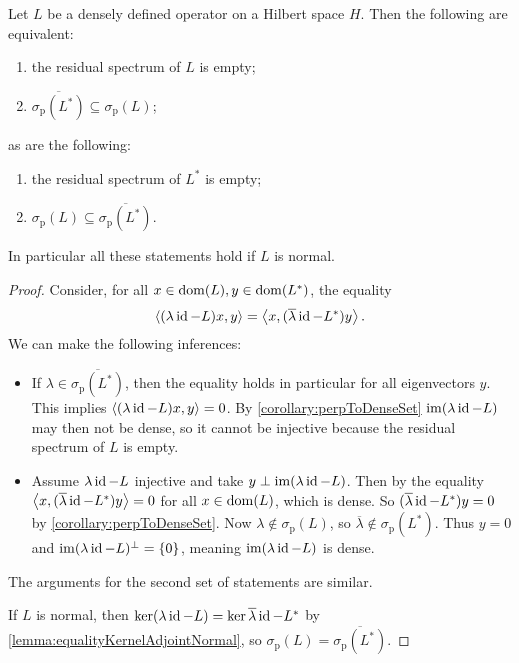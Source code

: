 \begin{proposition} \label{prop:adjointSpectrumNoResidual}
Let $L$ be a densely defined operator on a Hilbert space $H$. Then the following are equivalent:
\begin{enumerate}
\item the residual spectrum of $L$ is empty;
\item $\overline{\sigma_\text{p}(L^*)} \subseteq \sigma_\text{p}(L)$;
\end{enumerate}
as are the following:
\begin{enumerate}
\item the residual spectrum of $L^*$ is empty;
\item $\sigma_\text{p}(L) \subseteq \overline{\sigma_\text{p}(L^*)}$.
\end{enumerate}
In particular all these statements hold if $L$ is normal.
\end{proposition}
\begin{proof}
Consider, for all $x\in \operatorname{dom}(L), y\in\operatorname{dom}(L^*)$, the equality
\[ \left\langle (\lambda\operatorname{id}-L)x,y \right\rangle = \left\langle x,(\overline{\lambda}\operatorname{id}-L^*)y \right\rangle. \]
We can make the following inferences:
\begin{itemize}
\item If $\lambda\in \overline{\sigma_\text{p}(L^*)}$, then the equality holds in particular for all eigenvectors $y$. This implies $\left\langle (\lambda\operatorname{id}-L)x,y \right\rangle = 0$. By \ref{corollary:perpToDenseSet} $\operatorname{im}(\lambda\operatorname{id}-L)$ may then not be dense, so it cannot be injective because the residual spectrum of $L$ is empty.
\item Assume $\lambda\operatorname{id}-L$ injective and take  $y\perp \operatorname{im}(\lambda\operatorname{id}-L)$. Then by the equality $\left\langle x, (\overline{\lambda}\operatorname{id} - L^*)y \right\rangle = 0$ for all $x\in\operatorname{dom}(L)$, which is dense. So $(\overline{\lambda}\operatorname{id} - L^*)y = 0$ by \ref{corollary:perpToDenseSet}. Now $\lambda\notin \sigma_\text{p}(L)$, so $\overline{\lambda}\notin \sigma_\text{p}(L^*)$. Thus $y = 0$ and $\operatorname{im}(\lambda\operatorname{id}-L)^\perp = \{0\}$, meaning $\operatorname{im}(\lambda\operatorname{id}-L)$ is dense.
\end{itemize}
The arguments for the second set of statements are similar.

If $L$ is normal, then $\ker(\lambda \operatorname{id} - L) = \ker{\overline{\lambda}\operatorname{id}-L^*}$ by \ref{lemma:equalityKernelAdjointNormal}, so $\sigma_\text{p}(L) = \overline{\sigma_\text{p}(L^*)}$.
\end{proof}

